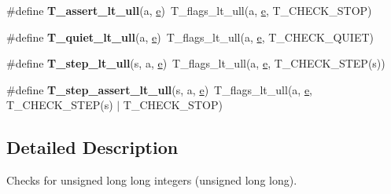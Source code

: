 \begin{DoxyCompactItemize}
\item 
\mbox{\label{group__RTEMSTestFrameworkChecksULongLong_ga9d56688494ced21f46c3fe6cf07bdd59}} 
\#define {\bfseries T\+\_\+assert\+\_\+lt\+\_\+ull}(a,  \mbox{\hyperlink{sun4u_2tte_8h_a8b0b9ed08e0e18920ec2682f48228c27}{e}})~T\+\_\+flags\+\_\+lt\+\_\+ull(a, \mbox{\hyperlink{sun4u_2tte_8h_a8b0b9ed08e0e18920ec2682f48228c27}{e}}, T\+\_\+\+C\+H\+E\+C\+K\+\_\+\+S\+T\+OP)
\item 
\mbox{\label{group__RTEMSTestFrameworkChecksULongLong_gaa98b00ec0886563bb115e448abd35f37}} 
\#define {\bfseries T\+\_\+quiet\+\_\+lt\+\_\+ull}(a,  \mbox{\hyperlink{sun4u_2tte_8h_a8b0b9ed08e0e18920ec2682f48228c27}{e}})~T\+\_\+flags\+\_\+lt\+\_\+ull(a, \mbox{\hyperlink{sun4u_2tte_8h_a8b0b9ed08e0e18920ec2682f48228c27}{e}}, T\+\_\+\+C\+H\+E\+C\+K\+\_\+\+Q\+U\+I\+ET)
\item 
\mbox{\label{group__RTEMSTestFrameworkChecksULongLong_gada1f064097c1fd05557a17611458182d}} 
\#define {\bfseries T\+\_\+step\+\_\+lt\+\_\+ull}(s,  a,  \mbox{\hyperlink{sun4u_2tte_8h_a8b0b9ed08e0e18920ec2682f48228c27}{e}})~T\+\_\+flags\+\_\+lt\+\_\+ull(a, \mbox{\hyperlink{sun4u_2tte_8h_a8b0b9ed08e0e18920ec2682f48228c27}{e}}, T\+\_\+\+C\+H\+E\+C\+K\+\_\+\+S\+T\+EP(s))
\item 
\mbox{\label{group__RTEMSTestFrameworkChecksULongLong_ga4a394f3d22532a843e83bbf19ee5cca4}} 
\#define {\bfseries T\+\_\+step\+\_\+assert\+\_\+lt\+\_\+ull}(s,  a,  \mbox{\hyperlink{sun4u_2tte_8h_a8b0b9ed08e0e18920ec2682f48228c27}{e}})~T\+\_\+flags\+\_\+lt\+\_\+ull(a, \mbox{\hyperlink{sun4u_2tte_8h_a8b0b9ed08e0e18920ec2682f48228c27}{e}}, T\+\_\+\+C\+H\+E\+C\+K\+\_\+\+S\+T\+EP(s) $\vert$ T\+\_\+\+C\+H\+E\+C\+K\+\_\+\+S\+T\+OP)
\end{DoxyCompactItemize}


\subsection{Detailed Description}
Checks for unsigned long long integers (unsigned long long). 


